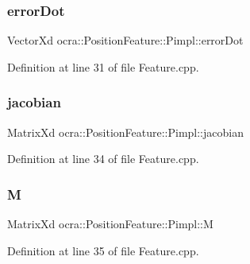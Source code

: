\hypertarget{structocra_1_1PositionFeature_1_1Pimpl_a3bff7b8d61a5575a68503d6767478950}{}\label{structocra_1_1PositionFeature_1_1Pimpl_a3bff7b8d61a5575a68503d6767478950} 
\subsubsection{\texorpdfstring{error\+Dot}{errorDot}}
{\footnotesize\ttfamily Vector\+Xd ocra\+::\+Position\+Feature\+::\+Pimpl\+::error\+Dot}



Definition at line 31 of file Feature.\+cpp.

\hypertarget{structocra_1_1PositionFeature_1_1Pimpl_a9cd18a0039e2ebbce05d78403667dd02}{}\label{structocra_1_1PositionFeature_1_1Pimpl_a9cd18a0039e2ebbce05d78403667dd02} 
\subsubsection{\texorpdfstring{jacobian}{jacobian}}
{\footnotesize\ttfamily Matrix\+Xd ocra\+::\+Position\+Feature\+::\+Pimpl\+::jacobian}



Definition at line 34 of file Feature.\+cpp.

\hypertarget{structocra_1_1PositionFeature_1_1Pimpl_aa061dcd02d8f11de5edd55e8f2535bfe}{}\label{structocra_1_1PositionFeature_1_1Pimpl_aa061dcd02d8f11de5edd55e8f2535bfe} 
\subsubsection{\texorpdfstring{M}{M}}
{\footnotesize\ttfamily Matrix\+Xd ocra\+::\+Position\+Feature\+::\+Pimpl\+::M}



Definition at line 35 of file Feature.\+cpp.

\hypertarget{structocra_1_1PositionFeature_1_1Pimpl_a7f6b8df16f7f9cbbe8e917e3ed4811eb}{}\label{structocra_1_1PositionFeature_1_1Pimpl_a7f6b8df16f7f9cbbe8e917e3ed4811eb} 
